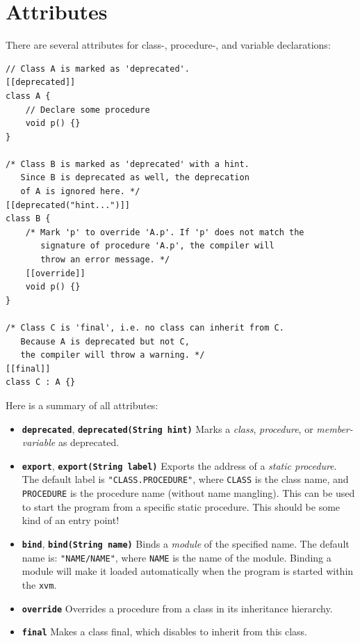 \documentclass[a5paper]{report}
\def\xvm{\texttt{xvm}\xspace}
\begin{document}
\section{Attributes}

There are several attributes for class-, procedure-, and variable declarations:
\begin{lstlisting}
// Class A is marked as 'deprecated'.
[[deprecated]]
class A {
    // Declare some procedure
    void p() {}
}

/* Class B is marked as 'deprecated' with a hint.
   Since B is deprecated as well, the deprecation
   of A is ignored here. */
[[deprecated("hint...")]]
class B {
    /* Mark 'p' to override 'A.p'. If 'p' does not match the
       signature of procedure 'A.p', the compiler will
       throw an error message. */
    [[override]]
    void p() {}
}

/* Class C is 'final', i.e. no class can inherit from C.
   Because A is deprecated but not C,
   the compiler will throw a warning. */
[[final]]
class C : A {}
\end{lstlisting}
Here is a summary of all attributes:
\begin{itemize}
	\item \textbf{\texttt{deprecated}}, \textbf{\texttt{deprecated(String hint)}}
		Marks a \textit{class}, \textit{procedure}, or \textit{member-variable} as deprecated.
	\item \textbf{\texttt{export}}, \textbf{\texttt{export(String label)}}
		Exports the address of a \textit{static procedure}. The default label is \texttt{"CLASS.PROCEDURE"},
		where \texttt{CLASS} is the class name, and \texttt{PROCEDURE} is the procedure name (without name mangling).
		This can be used to start the program from a specific static procedure. This should be some kind of an entry point!
	\item \textbf{\texttt{bind}}, \textbf{\texttt{bind(String name)}}
		Binds a \textit{module} of the specified name. The default name is: \texttt{"NAME/NAME"},
		where \texttt{NAME} is the name of the module. Binding a module will make it loaded automatically when the
		program is started within the \xvm.
	\item \textbf{\texttt{override}} Overrides a procedure from a class in its inheritance hierarchy.
	\item \textbf{\texttt{final}} Makes a class final, which disables to inherit from this class.
\end{itemize}


\end{document}
